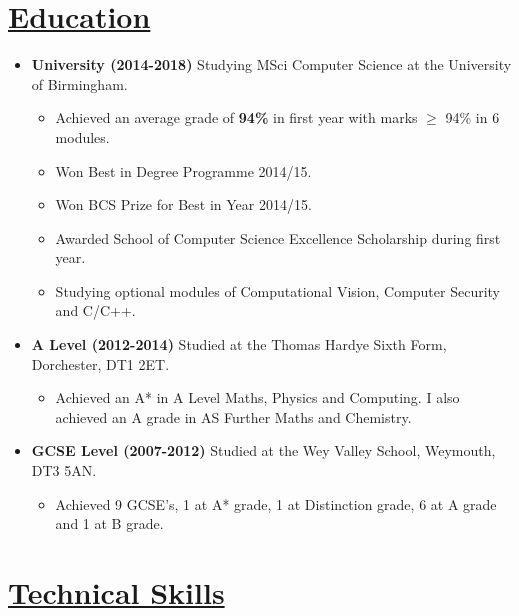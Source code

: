 \documentclass[11pt]{article}
\begin{document}
	\vspace{-30pt}
	\hspace{-100pt}\section*{\underline{Education}}
		\begin {itemize}
			\item \textbf{University (2014-2018)} Studying MSci Computer Science at the University of Birmingham.
				\begin{itemize}
					\item Achieved an average grade of\textbf{ 94\%} in first year with marks $\geq$ 94\% in 6 modules.
					\item Won Best in Degree Programme 2014/15.
					\item Won BCS Prize for Best in Year 2014/15.
					\item Awarded School of Computer Science Excellence Scholarship during first year.
					\item Studying optional modules of Computational Vision, Computer Security and C/C++.
				\end{itemize}
			\item \textbf{A Level (2012-2014)} Studied at the Thomas Hardye Sixth Form, Dorchester, DT1 2ET.
				\begin{itemize}
					\item Achieved an A* in A Level Maths, Physics and Computing. I also achieved an A grade in AS Further Maths and Chemistry.
				\end{itemize}
			
			\item \textbf{GCSE Level (2007-2012)}  Studied at the Wey Valley School, Weymouth, DT3 5AN. 
				\begin{itemize}
					\item Achieved 9 GCSE's, 1 at A* grade, 1 at Distinction grade, 6 at A grade and 1 at B grade.
				\end{itemize} 
		\end{itemize}
	\vspace{-20pt}
	\hspace{-100pt}\section*{\underline{Technical Skills}}
\end{document}
